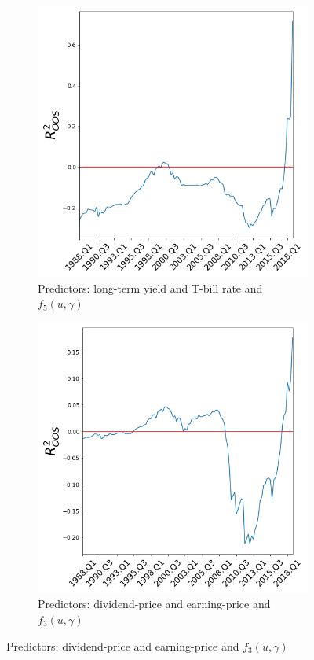 \documentclass[a4paper,12pt,times,numbered,print,index]{report}
\numberwithin{equation}{section}
\begin{document}
\begin{figure}[H]
		\medskip
		\begin{subfigure}{0.48\textwidth}
			\captionsetup{justification=centering}
			\includegraphics[width=0.8\linewidth]{co2f5.png}
			\caption{Predictors: long-term yield and T-bill rate and $f_{5}( u,\gamma)$ } \label{co2f5}
		\end{subfigure}\hspace*{\fill}
		\begin{subfigure}{0.48\textwidth}
			\captionsetup{justification=centering}
			\includegraphics[width=0.8\linewidth]{co1f3.png}
			\caption{Predictors: dividend-price and earning-price and $f_{3}( u,\gamma)$ } \label{co1f3}
		\end{subfigure}
		

\end{figure}
\end{document}
